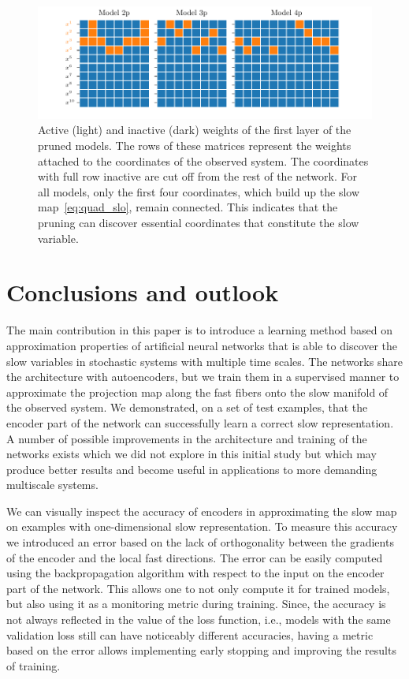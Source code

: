 \documentclass{article}
\begin{document}
\begin{figure}
    \centering
    \includegraphics[width=\textwidth]{figs/quad10d_sparsity.pdf}
    \caption{Active (light) and inactive (dark) weights of the first layer of the pruned models. The rows of these matrices represent the weights attached to the coordinates of the observed system. The coordinates with full row inactive are cut off from the rest of the network. For all models, only the first four coordinates, which build up the slow map~\eqref{eq:quad_slo}, remain connected. This indicates that the pruning can discover essential coordinates that constitute the slow variable.}
    \label{fig:quad10d_sparsity}
\end{figure}

\section{Conclusions and outlook}
The main contribution in this paper is to introduce a learning method based on approximation properties of artificial neural networks that is able to discover the slow variables in stochastic systems with multiple time scales. The networks share the architecture with autoencoders, but we train them in a supervised manner to approximate the projection map along the fast fibers onto the slow manifold of the observed system. We demonstrated, on a set of test examples, that the encoder part of the network can successfully learn a correct slow representation. A number of possible improvements in the architecture and training of the networks exists which we did not explore in this initial study but which may produce better results and become useful in applications to more demanding multiscale systems.

We can visually inspect the accuracy of encoders in approximating the slow map on examples with one-dimensional slow representation. To measure this accuracy we introduced an error based on the lack of orthogonality between the gradients of the encoder and the local fast directions. The error can be easily computed using the backpropagation algorithm with respect to the input on the encoder part of the network. This allows one to not only compute it for trained models, but also using it as a monitoring metric during training. Since, the accuracy is not always reflected in the value of the loss function, i.e., models with the same validation loss still can have noticeably different accuracies, having a metric based on the error allows implementing early stopping and improving the results of training.
\end{document}
